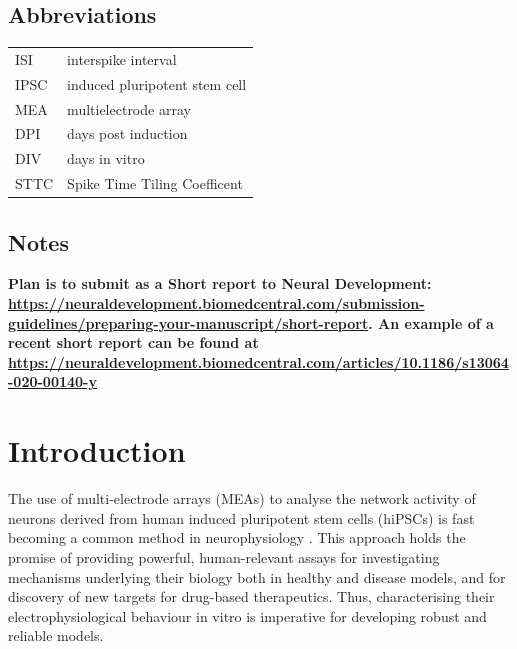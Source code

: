 \documentclass[doublespacing]{bmcart}
\begin{document}
\begin{frontmatter}
\begin{abstractbox}
\begin{keyword}

\end{keyword}

\end{abstractbox}

\subsection*{Abbreviations}
\begin{tabular}{ll}
  ISI & interspike interval\\
  IPSC & induced pluripotent stem cell\\
  MEA & multielectrode array\\
  DPI & days post induction\\
  DIV & days in vitro\\
  STTC & Spike Time Tiling Coefficent\\
\end{tabular}

\end{frontmatter}



\subsection*{Notes}
\textbf{Plan is to submit as a Short report to Neural Development:
  \url{https://neuraldevelopment.biomedcentral.com/submission-guidelines/preparing-your-manuscript/short-report}.
  An example of a recent short report can be found at 
\url{https://neuraldevelopment.biomedcentral.com/articles/10.1186/s13064-020-00140-y}}




\section*{Introduction}
\par The use of multi-electrode arrays (MEAs) to analyse the network activity
of neurons derived from human induced pluripotent stem cells (hiPSCs) is
fast becoming a common method in neurophysiology \cite{Odawara2014-wz,Matsuda2018-nf,Frega2017-rt,Ishii2017-pa}.
This approach holds the promise of providing powerful, human-relevant
assays for investigating mechanisms underlying their biology both in
healthy and disease models, and for discovery of new targets for
drug-based therapeutics. Thus, characterising their electrophysiological
behaviour in vitro is imperative for developing robust and reliable
models.
\end{document}
